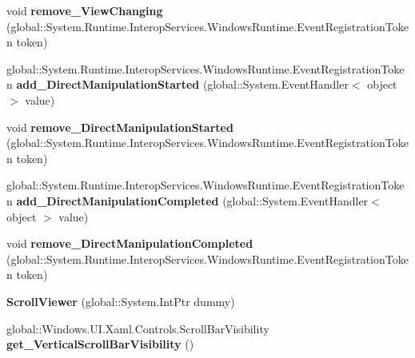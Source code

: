\begin{DoxyCompactItemize}
void {\bfseries remove\+\_\+\+View\+Changing} (global\+::\+System.\+Runtime.\+Interop\+Services.\+Windows\+Runtime.\+Event\+Registration\+Token token)
\item 
\mbox{\label{class_windows_1_1_u_i_1_1_xaml_1_1_controls_1_1_scroll_viewer_adab47141d357f03365676f3c0dc8360c}} 
global\+::\+System.\+Runtime.\+Interop\+Services.\+Windows\+Runtime.\+Event\+Registration\+Token {\bfseries add\+\_\+\+Direct\+Manipulation\+Started} (global\+::\+System.\+Event\+Handler$<$ object $>$ value)
\item 
\mbox{\label{class_windows_1_1_u_i_1_1_xaml_1_1_controls_1_1_scroll_viewer_a34f553f86c580da23d4109f5e64d47bc}} 
void {\bfseries remove\+\_\+\+Direct\+Manipulation\+Started} (global\+::\+System.\+Runtime.\+Interop\+Services.\+Windows\+Runtime.\+Event\+Registration\+Token token)
\item 
\mbox{\label{class_windows_1_1_u_i_1_1_xaml_1_1_controls_1_1_scroll_viewer_a5700eed19403dac498a6b0e4c2164043}} 
global\+::\+System.\+Runtime.\+Interop\+Services.\+Windows\+Runtime.\+Event\+Registration\+Token {\bfseries add\+\_\+\+Direct\+Manipulation\+Completed} (global\+::\+System.\+Event\+Handler$<$ object $>$ value)
\item 
\mbox{\label{class_windows_1_1_u_i_1_1_xaml_1_1_controls_1_1_scroll_viewer_abfd26932c4679f145e20ab03785ea8be}} 
void {\bfseries remove\+\_\+\+Direct\+Manipulation\+Completed} (global\+::\+System.\+Runtime.\+Interop\+Services.\+Windows\+Runtime.\+Event\+Registration\+Token token)
\item 
\mbox{\label{class_windows_1_1_u_i_1_1_xaml_1_1_controls_1_1_scroll_viewer_ae43835a1ae5cf186b95dbddb1dec3e35}} 
{\bfseries Scroll\+Viewer} (global\+::\+System.\+Int\+Ptr dummy)
\item 
\mbox{\label{class_windows_1_1_u_i_1_1_xaml_1_1_controls_1_1_scroll_viewer_ae2150cc90ac054e44b19688d45254504}} 
global\+::\+Windows.\+U\+I.\+Xaml.\+Controls.\+Scroll\+Bar\+Visibility {\bfseries get\+\_\+\+Vertical\+Scroll\+Bar\+Visibility} ()

\end{DoxyCompactItemize}
